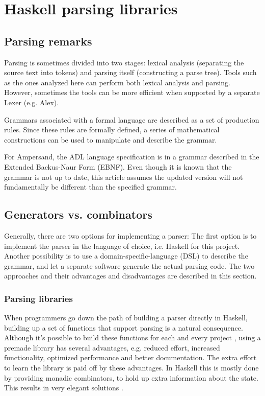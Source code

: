 
\section{Haskell parsing libraries}
\label{sec:libraries}

\subsection{Parsing remarks}
%
%
%
Parsing is sometimes divided into two stages: lexical analysis (separating the source text into tokens) and parsing itself (constructing a parse tree).
Tools such as the ones analyzed here can perform both lexical analysis and parsing.
However, sometimes the tools can be more efficient when supported by a separate Lexer (e.g. Alex).

Grammars associated with a formal language are described as a set of production rules.
Since these rules are formally defined, a series of mathematical constructions can be used to manipulate and describe the grammar.

%
%
%
For Ampersand, the ADL language specification is in a grammar described in the Extended Backus-Naur Form (EBNF).
Even though it is known that the grammar is not up to date, this article assumes the updated version will not fundamentally be different than the specified grammar.

\subsection{Generators vs. combinators}
%
Generally, there are two options for implementing a parser:
The first option is to implement the parser in the language of choice, i.e. Haskell for this project.
Another possibility is to use a domain-specific-language (DSL) to describe the grammar, and let a separate software generate the actual parsing code.
The two approaches and their advantages and disadvantages are described in this section.

\subsubsection{Parsing libraries}
When programmers go down the path of building a parser directly in Haskell, building up a set of functions that support parsing is a natural consequence.
Although it's possible to build these functions for each and every project \cite{monadic-parsing}, using a premade library has several advantages, e.g. reduced effort, increased functionality, optimized performance and better documentation.
The extra effort to learn the library is paid off by these advantages.
In Haskell this is mostly done by providing monadic combinators, to hold up extra information about the state.
This results in very elegant solutions \cite{monadic-parsing}.

